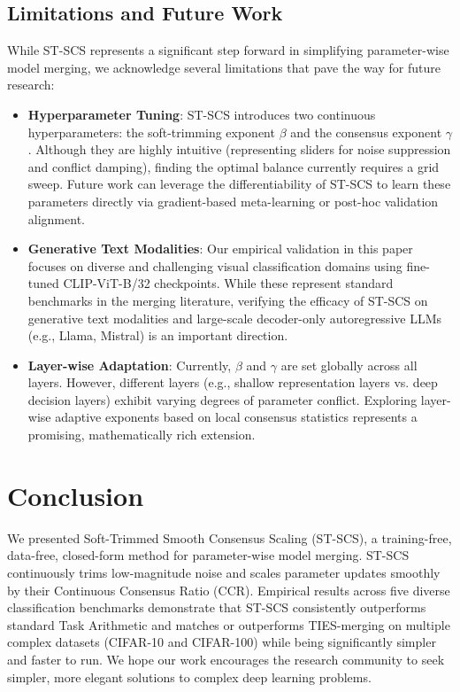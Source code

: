 \documentclass{article}
\theoremstyle{plain}
\theoremstyle{definition}
\theoremstyle{remark}
\begin{document}
\subsection{Limitations and Future Work}
While ST-SCS represents a significant step forward in simplifying parameter-wise model merging, we acknowledge several limitations that pave the way for future research:
\begin{itemize}
    \item \textbf{Hyperparameter Tuning}: ST-SCS introduces two continuous hyperparameters: the soft-trimming exponent $\beta$ and the consensus exponent $\gamma$. Although they are highly intuitive (representing sliders for noise suppression and conflict damping), finding the optimal balance currently requires a grid sweep. Future work can leverage the differentiability of ST-SCS to learn these parameters directly via gradient-based meta-learning or post-hoc validation alignment.
    \item \textbf{Generative Text Modalities}: Our empirical validation in this paper focuses on diverse and challenging visual classification domains using fine-tuned CLIP-ViT-B/32 checkpoints. While these represent standard benchmarks in the merging literature, verifying the efficacy of ST-SCS on generative text modalities and large-scale decoder-only autoregressive LLMs (e.g., Llama, Mistral) is an important direction.
    \item \textbf{Layer-wise Adaptation}: Currently, $\beta$ and $\gamma$ are set globally across all layers. However, different layers (e.g., shallow representation layers vs. deep decision layers) exhibit varying degrees of parameter conflict. Exploring layer-wise adaptive exponents based on local consensus statistics represents a promising, mathematically rich extension.
\end{itemize}

\section{Conclusion}
\label{sec:conclusion}
We presented Soft-Trimmed Smooth Consensus Scaling (ST-SCS), a training-free, data-free, closed-form method for parameter-wise model merging. ST-SCS continuously trims low-magnitude noise and scales parameter updates smoothly by their Continuous Consensus Ratio (CCR). Empirical results across five diverse classification benchmarks demonstrate that ST-SCS consistently outperforms standard Task Arithmetic and matches or outperforms TIES-merging on multiple complex datasets (CIFAR-10 and CIFAR-100) while being significantly simpler and faster to run. We hope our work encourages the research community to seek simpler, more elegant solutions to complex deep learning problems.

\nocite{*}


\end{document}

